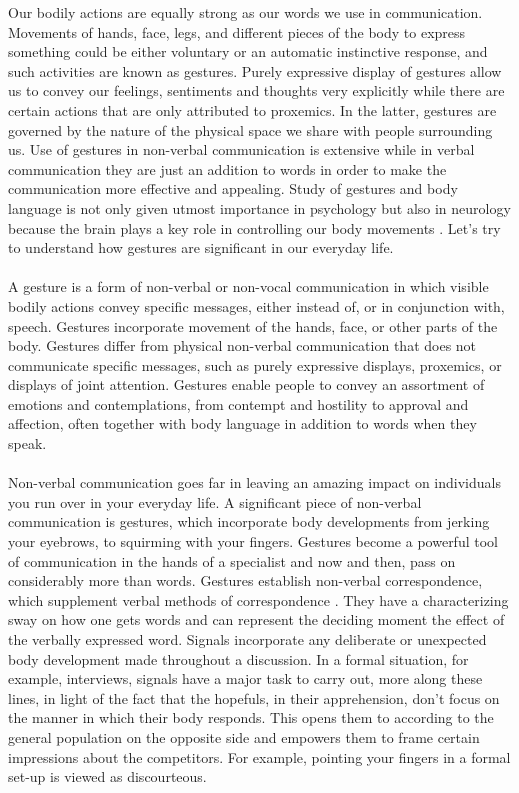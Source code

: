\documentclass{article}
\begin{document}
Our bodily actions are equally strong as our words we use in communication. Movements of hands, face, legs, and different pieces of the body to express something could be either voluntary or an automatic instinctive response, and such activities are known as gestures. Purely expressive display of gestures allow us to convey our feelings, sentiments and thoughts very explicitly while there are certain actions that are only attributed to proxemics. In the latter, gestures are governed by the nature of the physical space we share with people surrounding us. Use of gestures in non-verbal communication is extensive while in verbal communication they are just an addition to words in order to make the communication more effective and appealing. Study of gestures and body language is not only given utmost importance in psychology but also in neurology because the brain plays a key role in controlling our body movements \cite{wu2007iconic}. Let's try to understand how gestures are significant in our everyday life. 
\\\\
A gesture is a form of non-verbal or non-vocal communication in which visible bodily actions convey specific messages, either instead of, or in conjunction with, speech. Gestures incorporate movement of the hands, face, or other parts of the body. \cite{muller2013body} Gestures differ from physical non-verbal communication that does not communicate specific messages, such as purely expressive displays, proxemics, or displays of joint attention. Gestures enable people to convey an assortment of emotions and contemplations, from contempt and hostility to approval and affection, often together with body language in addition to words when they speak.
\\\\
Non-verbal communication goes far in leaving an amazing impact on individuals you run over in your everyday life. A significant piece of non-verbal communication is gestures, which incorporate body developments from jerking your eyebrows, to squirming with your fingers. Gestures become a powerful tool of communication in the hands of a specialist and now and then, pass on considerably more than words. Gestures establish non-verbal correspondence, which supplement verbal methods of correspondence \cite{muller2013body}. They have a characterizing sway on how one gets words and can represent the deciding moment the effect of the verbally expressed word. Signals incorporate any deliberate or unexpected body development made throughout a discussion. In a formal situation, for example, interviews, signals have a major task to carry out, more along these lines, in light of the fact that the hopefuls, in their apprehension, don't focus on the manner in which their body responds. This opens them to according to the general population on the opposite side and empowers them to frame certain impressions about the competitors. For example, pointing your fingers in a formal set-up is viewed as discourteous.
\end{document}
